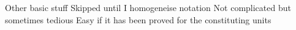 \documentclass[aspectratio=169]{beamer}\usepackage[]{graphicx}\usepackage[]{xcolor}
\begin{document}
\begin{frame}{Other basic stuff}
	Skipped until I homogeneise notation
	\vfill
	Not complicated but sometimes tedious
	\vfill
	Easy if it has been proved for the constituting units
\end{frame}









\end{document}
